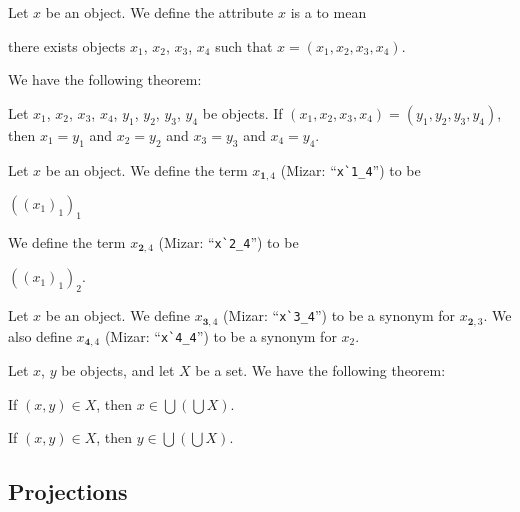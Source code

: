 \begin{definition}
Let $x$ be an object. We define the attribute $x$ is a
 to mean
\begin{defn}
\item there exists objects $x_{1}$, $x_{2}$, $x_{3}$, $x_{4}$ such that $x=(x_{1},x_{2},x_{3},x_{4})$.
\end{defn}
\end{definition}



We have the following theorem:
\begin{thm}
\item\label{xtuple0:5} Let $x_{1}$, $x_{2}$, $x_{3}$, $x_{4}$, $y_{1}$, $y_{2}$, $y_{3}$, $y_{4}$
be objects. If $(x_{1},x_{2},x_{3},x_{4})=(y_{1},y_{2},y_{3},y_{4})$,
then $x_{1}=y_{1}$ and $x_{2}=y_{2}$ and $x_{3}=y_{3}$ and $x_{4}=y_{4}$.
\end{thm}

\begin{definition}
Let $x$ be an object. We define the term $x_{\mathbf{1},4}$ (Mizar: ``\verb#x`1_4#'') to be
\begin{defn}
\item $((x_{1})_{1})_{1}$
\end{defn}
We define the term $x_{\mathbf{2},4}$ (Mizar: ``\verb#x`2_4#'') to be
\begin{defn}
\item $((x_{1})_{1})_{2}$.
\end{defn}
\end{definition}

\begin{notation}
Let $x$ be an object. We define $x_{\mathbf{3},4}$ (Mizar: ``\verb#x`3_4#'') to be a synonym for $x_{\mathbf{2},3}$.
We also define $x_{\mathbf{4},4}$ (Mizar: ``\verb#x`4_4#'') to be a
synonym for $x_{2}$.
\end{notation}

Let $x$, $y$ be objects, and let $X$ be a set. We have the following theorem:
\begin{thm}
\item\label{xtuple0:6} If $(x,y)\in X$, then $x\in\bigcup(\bigcup X)$.
\item\label{xtuple0:7} If $(x,y)\in X$, then $y\in\bigcup(\bigcup X)$.
\end{thm}

\subsection{Projections}

